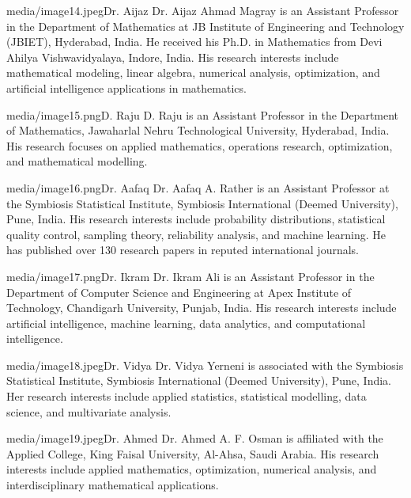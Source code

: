 \documentclass[10pt]{NSP1}
\begin{document}
\begin{biographyps}{media/image14.jpeg}{Dr. Aijaz}
Dr. Aijaz Ahmad Magray is an Assistant Professor in the Department of Mathematics at JB Institute of Engineering and Technology (JBIET), Hyderabad, India. He received his Ph.D. in Mathematics from Devi Ahilya Vishwavidyalaya, Indore, India. His research interests include mathematical modeling, linear algebra, numerical analysis, optimization, and artificial intelligence applications in mathematics.\end{biographyps}

\begin{biographyps}{media/image15.png}{D. Raju}
D. Raju is an Assistant Professor in the Department of Mathematics, Jawaharlal Nehru Technological University, Hyderabad, India. His research focuses on applied mathematics, operations research, optimization, and mathematical modelling.\end{biographyps}

\begin{biographyps}{media/image16.png}{Dr. Aafaq}
Dr. Aafaq A. Rather is an Assistant Professor at the Symbiosis Statistical Institute, Symbiosis International (Deemed University), Pune, India. His research interests include probability distributions, statistical quality control, sampling theory, reliability analysis, and machine learning. He has published over 130 research papers in reputed international journals.\end{biographyps}

\begin{biographyps}{media/image17.png}{Dr. Ikram}
Dr. Ikram Ali is an Assistant Professor in the Department of Computer Science and Engineering at Apex Institute of Technology, Chandigarh University, Punjab, India. His research interests include artificial intelligence, machine learning, data analytics, and computational intelligence.\end{biographyps}

\begin{biographyps}{media/image18.jpeg}{Dr. Vidya}
Dr. Vidya Yerneni is associated with the Symbiosis Statistical Institute, Symbiosis International (Deemed University), Pune, India. Her research interests include applied statistics, statistical modelling, data science, and multivariate analysis.\end{biographyps}

\begin{biographyps}{media/image19.jpeg}{Dr. Ahmed}
Dr. Ahmed A. F. Osman is affiliated with the Applied College, King Faisal University, Al-Ahsa, Saudi Arabia. His research interests include applied mathematics, optimization, numerical analysis, and interdisciplinary mathematical applications.\end{biographyps}
\end{document}
